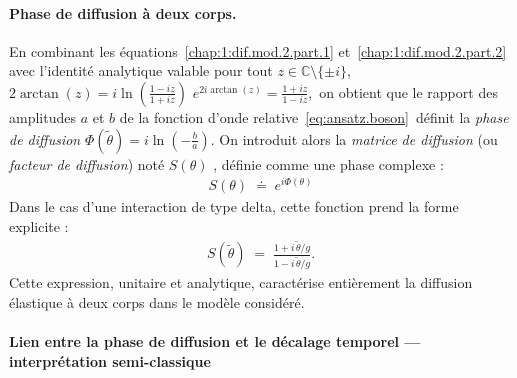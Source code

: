\paragraph{Phase de diffusion à deux corps.}

En combinant les équations~\eqref{chap:1:dif.mod.2.part.1} et~\eqref{chap:1:dif.mod.2.part.2} avec l’identité analytique valable pour tout
\(z \in \mathbb{C}\setminus\{\pm i\}\),
\(
2\arctan(z)=i\ln\!\left(\frac{1-iz}{1+iz}\right)
\)
\ie 
\(
e^{2i\arctan(z)}=\frac{1+iz}{1-iz},
\)
on obtient que le rapport des amplitudes \(a\) et \(b\) de la fonction
d’onde relative~\eqref{eq:ansatz.boson} définit la {\em phase de diffusion }
\(
\Phi(\tilde{\theta}) = i\ln\!\left(-\frac{b}{a}\right).
\)
On introduit alors la {\em matrice de diffusion} (ou {\em facteur de diffusion}) noté  \(S(\theta) \) , définie comme une phase complexe : 
\begin{eqnarray}\label{chap:1:def.mat.dif.1}
	S(\theta) \;\doteq\; e^{i\Phi(\theta)}	
\end{eqnarray}
Dans le cas d’une interaction de type delta, cette fonction prend la forme explicite :
\begin{eqnarray}\label{chap:1:dif.mod.2.part.3}
	S(\tilde{\theta}) \; = \; \frac{1 + i\,\tilde{\theta}/g}{1 - i\,\tilde{\theta}/g}.%
\end{eqnarray}
Cette expression, unitaire et analytique, caractérise entièrement la diffusion élastique à deux corps dans le modèle considéré.



\paragraph{Lien entre la phase de diffusion et le décalage temporel — interprétation semi-classique}
%
%
%


